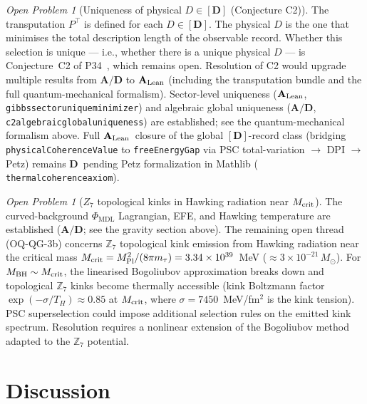 \documentclass[11pt]{article}
\theoremstyle{remark}
\newtheorem{openprob}[theorem]{Open Problem}
\newcommand{\PHIMDL}{\Phi_{\mathrm{MDL}}}
\newcommand{\ZS}{\mathbb{Z}_7}
\newcommand{\lean}[1]{%
  \penalty-100
  \begingroup\def\_{\textunderscore\allowbreak}\texttt{#1}\endgroup}
\newcommand{\CatAL}{\ensuremath{\textbf{A}_{\rm Lean}}}
\newcommand{\CatAD}{\textbf{A/D}}
\newcommand{\CatD}{\textbf{D}}
\begin{document}
\begin{openprob}[Uniqueness of physical $D\in{[\mathbf{D}]}$ (Conjecture C2)]
\label{oprob:C2}
The transputation $P^\top$ is defined for each $D\in[\mathbf{D}]$.  The
physical $D$ is the one that minimises the total description length of the
observable record.  Whether this selection is unique --- i.e., whether there
is a unique physical $D$ --- is Conjecture~C2 of P34~\cite{SpivackGTEMobius},
which remains open.  Resolution of C2 would upgrade multiple results from
$\CatAD$ to $\CatAL$ (including the transputation bundle and the full
quantum-mechanical formalism).
Sector-level uniqueness ($\CatAL$, \lean{gibbs\_sector\_unique\_minimizer})
and algebraic global uniqueness ($\CatAD$, \lean{c2\_algebraic\_global\_uniqueness})
are established; see the quantum-mechanical formalism above.
Full \CatAL\ closure of the global $[\mathbf{D}]$-record class (bridging
\lean{physicalCoherenceValue} to \lean{freeEnergyGap} via PSC total-variation
$\to$ DPI $\to$ Petz) remains \CatD\ pending Petz formalization in Mathlib
(\lean{thermal\_coherence\_axiom}).
\end{openprob}

\begin{openprob}[$Z_7$ topological kinks in Hawking radiation near $M_{\rm crit}$]
\label{oprob:QGR}
The curved-background $\PHIMDL$ Lagrangian, EFE, and Hawking temperature are
established ($\CatAD$; see the gravity section above).
The remaining open thread (OQ-QG-3b) concerns $\ZS$ topological kink emission
from Hawking radiation near the critical mass $M_{\rm crit} = M_{\rm Pl}^2/(8\pi m_\tau)
= 3.34\times10^{39}$~MeV ($\approx 3\times10^{-21}\,M_\odot$).
For $M_{\rm BH}\sim M_{\rm crit}$, the linearised Bogoliubov approximation
breaks down and topological $\ZS$ kinks become thermally accessible
(kink Boltzmann factor $\exp(-\sigma/T_H)\approx 0.85$ at $M_{\rm crit}$,
where $\sigma = 7450$~MeV/fm$^2$ is the kink tension).  PSC superselection
could impose additional selection rules on the emitted kink spectrum.
Resolution requires a nonlinear extension of the Bogoliubov method adapted
to the $\ZS$ potential.
\end{openprob}

\section{Discussion}
\label{sec:discussion}
\end{document}
